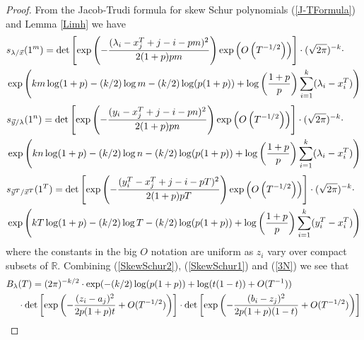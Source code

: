 \begin{proof}
	
From the Jacob-Trudi formula for skew Schur polynomials (\ref{J-TFormula}) and Lemma \ref{Limh} we have
\begin{align}{\label{SkewSchur1}}
	\begin{split}
		& s_{\lambda/\vec{x}}(1^{m})=\det\left[\exp\left(-\frac{(\lambda_{i}-x_{j}^{T}+j-i-pm)^{2}}{2(1+p)pm}\right)\exp\left(O\left( T^{-1/2}\right)\right)\right]\cdot (\sqrt{2\pi})^{-k}\cdot\\
		& \exp\left(km\log(1+p)-(k/2)\log m-(k/2)\log(p(1+p))+\log\left(\frac{1+p}{p}\right)\sum_{i=1}^{k}(\lambda_{i}-x^{T}_{i})\right)
	\end{split}
\end{align}
\begin{align}{\label{SkewSchur2}}
	\begin{split}
		& s_{\vec{y}/\lambda}(1^{n})=\det\left[\exp\left(-\frac{(y_i-x_{j}^{T}+j-i-pn)^{2}}{2(1+p)pn}\right)\exp\left(O\left( T^{-1/2}\right)\right)\right]\cdot (\sqrt{2\pi})^{-k}\cdot\\
		& \exp\left(kn\log(1+p)-(k/2)\log n-(k/2)\log(p(1+p))+\log\left(\frac{1+p}{p}\right)\sum_{i=1}^{k}(\lambda_{i}-x^{T}_{i})\right)
	\end{split}
\end{align}
\begin{align}{\label{SkewSchur3}}
	\begin{split}
		& s_{\vec{y}^T/\vec{x}^{T}}(1^{T})=\det\left[\exp\left(-\frac{(y_{i}^{T}-x_{j}^{T}+j-i-pT)^{2}}{2(1+p)pT}\right)\exp\left(O\left( T^{-1/2}\right)\right)\right]\cdot (\sqrt{2\pi})^{-k}\cdot\\
		& \exp\left(kT\log(1+p)-(k/2)\log T-(k/2)\log(p(1+p))+\log\left(\frac{1+p}{p}\right)\sum_{i=1}^{k}(y_{i}^{T}-x^{T}_{i})\right)
	\end{split}
\end{align}
where the constants in the big $O$ notation are uniform as $z_{i}$ vary over compact subsets of $\mathbb{R}$. Combining (\ref{SkewSchur2}), (\ref{SkewSchur1}) and (\ref{3N}) we see that
\begin{align}{\label{BLambdafinal}}
	\begin{split}
		B_{\lambda}&(T)=(2\pi)^{-k/2}\cdot\exp(-(k/2)\log(p(1+p))+\log(t(1-t))+O(T^{-1}))\\
		& \cdot \det\left[\exp\left(-\frac{(z_i-a_j)^2}{2p(1+p)t}+O(T^{-1/2})\right)\right]\cdot\det\left[\exp\left(-\frac{(b_i-z_j)^2}{2p(1+p)(1-t)}+O(T^{-1/2})\right)\right]
	\end{split}

\end{align}
\end{proof}
